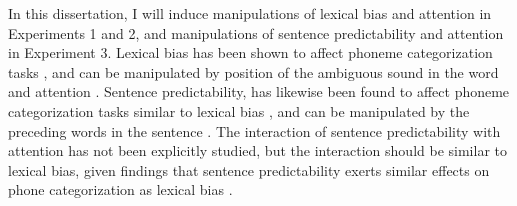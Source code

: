 In this dissertation,  I will induce manipulations of lexical bias and attention in Experiments 1 and 2, and manipulations of sentence predictability and attention in Experiment 3. 
Lexical bias has been shown to affect phoneme categorization tasks \citep{Ganong1980}, and can be manipulated by position of the ambiguous sound in the word and attention \citep{Pitt2012}.  
Sentence predictability, has likewise been found to affect phoneme categorization tasks similar to lexical bias \citep{Borsky1998}, and can be manipulated by the preceding words in the sentence \citep{Kalikow1977}.  
The interaction of sentence predictability with attention has not been explicitly studied, but the interaction should be similar to lexical bias, given findings that sentence predictability exerts similar effects on phone categorization as lexical bias \citep{Borsky1998}.
